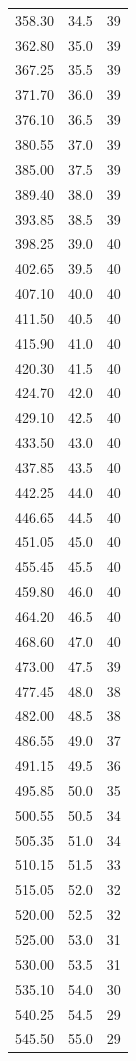 \documentclass[12pt]{report}
\begin{document}
\begin{small}
\begin{longtable}{S[table-format=3.2] S[table-format=2.1] S[table-format=2.0]}
358.30 & 34.5 & 39 \\
362.80 & 35.0 & 39 \\
367.25 & 35.5 & 39 \\
371.70 & 36.0 & 39 \\
376.10 & 36.5 & 39 \\
380.55 & 37.0 & 39 \\
385.00 & 37.5 & 39 \\
389.40 & 38.0 & 39 \\
393.85 & 38.5 & 39 \\
398.25 & 39.0 & 40 \\
402.65 & 39.5 & 40 \\
407.10 & 40.0 & 40 \\
411.50 & 40.5 & 40 \\
415.90 & 41.0 & 40 \\
420.30 & 41.5 & 40 \\
424.70 & 42.0 & 40 \\
429.10 & 42.5 & 40 \\
433.50 & 43.0 & 40 \\
437.85 & 43.5 & 40 \\
442.25 & 44.0 & 40 \\
446.65 & 44.5 & 40 \\
451.05 & 45.0 & 40 \\
455.45 & 45.5 & 40 \\
459.80 & 46.0 & 40 \\
464.20 & 46.5 & 40 \\
468.60 & 47.0 & 40 \\
473.00 & 47.5 & 39 \\
477.45 & 48.0 & 38 \\
482.00 & 48.5 & 38 \\
486.55 & 49.0 & 37 \\
491.15 & 49.5 & 36 \\
495.85 & 50.0 & 35 \\
500.55 & 50.5 & 34 \\
505.35 & 51.0 & 34 \\
510.15 & 51.5 & 33 \\
515.05 & 52.0 & 32 \\
520.00 & 52.5 & 32 \\
525.00 & 53.0 & 31 \\
530.00 & 53.5 & 31 \\
535.10 & 54.0 & 30 \\
540.25 & 54.5 & 29 \\
545.50 & 55.0 & 29 \\

\end{longtable}
\end{small}
\end{document}
